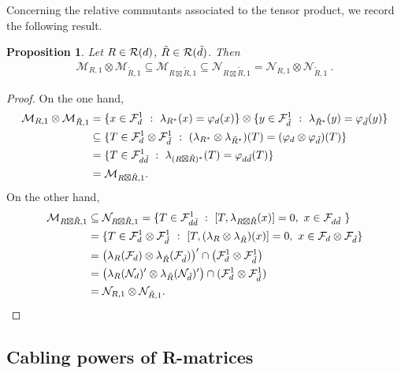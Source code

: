 \documentclass[12pt,a4paper]{amsart}
\numberwithin{equation}{section}
\newtheorem{proposition}[theorem]{Proposition}
\theoremstyle{remark}
\newcommand{\CM}[0]{\mathcal{M}} \newcommand{\CN}[0]{\mathcal{N}}
\begin{document}
\medskip

Concerning the relative commutants associated to the tensor product, we record the following result.
\begin{proposition} 
	Let $R\in\mathcal{R}(d)$, $\tilde R\in\mathcal{R}(\tilde d)$. Then 
	\begin{align}
        \CM_{R,1} \otimes \CM_{\tilde R,1} 
        \subseteq 
        \CM_{R \boxtimes \tilde R,1} 
        \subseteq 
        \CN_{R \boxtimes \tilde R,1} 
        = 
        \CN_{R,1} \otimes \CN_{\tilde R,1}  \ . 
	\end{align}
\end{proposition}
\begin{proof}
	On the one hand,
	\begin{align*}
		\CM_{R,1} \otimes \CM_{\tilde R,1} 
		&= 
		\{ x \in \CF_d^1 \ : \ \lambda_{R^*}(x) = \varphi_d(x) \} 
		\otimes 
		\{ y \in \CF_{\tilde d}^1 \ : \ \lambda_{\tilde R^*}(y) = \varphi_{\tilde d}(y) \}
		\\
		& \subseteq  
		\{ T \in \CF_d^1 \otimes \CF_{\tilde d}^1 \ : \ (\lambda_{R^*} \otimes \lambda_{\tilde R^*})(T) = (\varphi_d \otimes \varphi_{\tilde d})(T)\}
		\\
		&= 
		\{T \in \CF_{d\tilde d}^1 \ : \ \lambda_{(R \boxtimes \tilde R)^*}(T) = \varphi_{d\tilde d}(T)\}
		\\
		&= 
		\CM_{R \boxtimes \tilde R,1}. 
	\end{align*}
	On the other hand,
	\begin{align*}
		\CM_{R \boxtimes \tilde R,1}
		&\subseteq 
		\CN_{R \boxtimes \tilde R,1}
		= 
		\{T \in \CF_{d\tilde d}^1 \ : \ [T, \lambda_{R \boxtimes \tilde R}(x)] = 0, \ x \in \CF_{d\tilde d}\ \} 
		\\
		&= 
		\{T \in \CF_d^1 \otimes \CF_{\tilde d}^1 \ : \ [T,(\lambda_R\otimes \lambda_{\tilde R})(x)]=0, \ x \in \CF_d \otimes \CF_{\tilde d}\} 
		\\
		&= 
		\big(\lambda_R(\CF_d) \otimes \lambda_{\tilde R}(\CF_{\tilde d})\big)' \cap \big(\CF_d^1 \otimes \CF_{\tilde d}^1\big) 
		\\
		& 
		= \big(\lambda_R(\CN_d)' \otimes \lambda_{\tilde R}(\CN_{\tilde d})' \big) \cap (\CF_d^1 \otimes \CF_{\tilde d}^1) 
		\\
		& 
		= 
		\CN_{R,1} \otimes \CN_{\tilde R,1}.
\end{align*}
\end{proof}


\subsection{Cabling powers of R-matrices}
\end{document}
